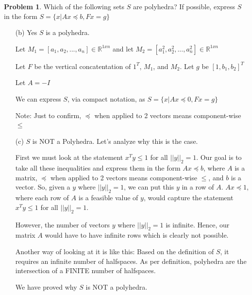 \documentclass{article}
\theoremstyle{definition}
\newtheorem{problem}{Problem}
\begin{document}
\begin{problem}
    Which of the following sets $S$ are polyhedra? If possible, express $S$ in the form $S = \{x | Ax \preceq b, Fx = g \}$
\begin{enumerate}
    \item[(b)]  Yes $S$ is a polyhedra. 

    Let $M_1 = [a_1, a_2, ..., a_n] \in \mathbb{R}^{1 x n}$ and let $M_2 = [a_1^2, a_2^2, ..., a_n^2] \in \mathbb{R}^{1 x n}$

    Let $F$ be the vertical concatentation of $1^T$, $M_1$, and $M_2$. Let $g$ be $[1, b_1, b_2]^T$

    Let $A = -I$
    
    We can express $S$, via compact notation, as $S = \{x | Ax \preceq 0, Fx = g \}$

    Note: Just to confirm, $\preceq$ when applied to 2 vectors means component-wise $\leq$

    \item [(c)] $S$ is NOT a Polyhedra. Let's analyze why this is the case. 

    First we must look at the statement $x^Ty \leq 1$ for all $||y||_2 = 1$. Our goal is to take all these inequalities and express them in the form $Ax \preceq b$, where $A$ is a matrix, $\preceq$ when applied to 2 vectors means component-wise $\leq$, and $b$ is a vector. So, given a $y$ where $||y||_2 = 1$, we can put this $y$ in a row of $A$. $Ax \preceq 1$, where each row of $A$ is a feasible value of $y$, would capture the statement $x^Ty \leq 1$ for all $||y||_2 = 1$. 
    
    However, the number of vectors $y$ where $||y||_2 = 1$ is infinite. Hence, our matrix $A$ would have to have infinite rows which is clearly not possible. 

    Another way of looking at it is like this: \newline 
    Based on the definition of $S$, it requires an infinite number of halfspaces. As per definition, polyhedra are the intersection of a FINITE number of halfspaces. 
    
    We have proved why $S$ is NOT a polyhedra.  
\end{enumerate}
\end{problem}
\end{document}
